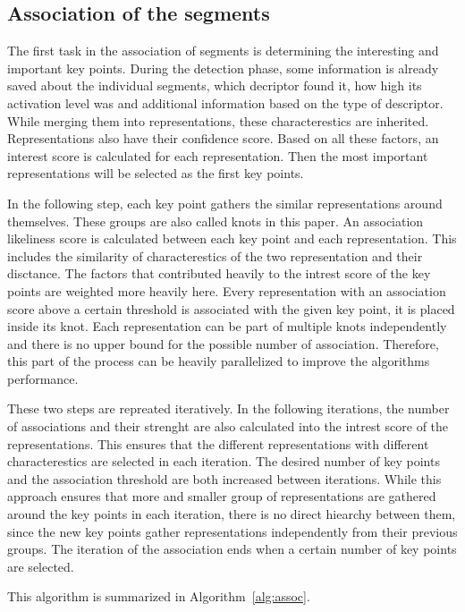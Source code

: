 \subsection{Association of the segments} %

The first task in the association of segments is determining the interesting and important key points. During the detection phase, some information is already saved about the individual segments, which decriptor found it, how high its activation level was and additional information based on the type of descriptor. While merging them into representations, these characterestics are inherited. Representations also have their confidence score. Based on all these factors, an interest score is calculated for each representation. Then the most important representations will be selected as the first key points.

In the following step, each key point gathers the similar representations around themselves. These groups are also called knots in this paper. An association likeliness score is calculated between each key point and each representation. This includes the similarity of characterestics of the two representation and their disctance. The factors that contributed heavily to the intrest score of the key points are weighted more heavily here. Every representation with an association score above a certain threshold is associated with the given key point, it is placed inside its knot. Each representation can be part of multiple knots independently and there is no upper bound for the possible number of association. Therefore, this part of the process can be heavily parallelized to improve the algorithms performance.

These two steps are repreated iteratively. In the following iterations, the number of associations and their strenght are also calculated into the intrest score of the representations. This ensures that the different representations with different characterestics are selected in each iteration. The desired number of key points and the association threshold are both increased between iterations. While this approach ensures that more and smaller group of representations are gathered around the key points in each iteration, there is no direct hiearchy between them, since the new key points gather representations independently from their previous groups. The iteration of the association ends when a certain number of key points are selected.

This algorithm is summarized in Algorithm~\ref{alg:assoc}.

